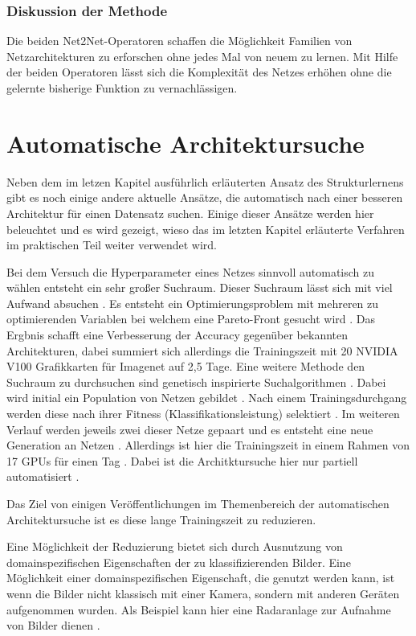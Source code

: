 \subsubsection{Diskussion der Methode}

Die beiden Net2Net-Operatoren schaffen die Möglichkeit Familien von Netzarchitekturen zu erforschen ohne jedes Mal von neuem zu lernen. Mit Hilfe der beiden Operatoren lässt sich die Komplexität des Netzes erhöhen ohne die gelernte bisherige Funktion zu vernachlässigen.




\section{Automatische Architektursuche}\label{sec:auto}
Neben dem im letzen Kapitel ausführlich erläuterten Ansatz des Strukturlernens gibt es noch einige andere aktuelle Ansätze, die automatisch nach einer besseren Architektur für einen Datensatz suchen. Einige dieser Ansätze werden hier beleuchtet und es wird gezeigt, wieso das im letzten Kapitel erläuterte Verfahren im praktischen Teil weiter verwendet wird.

Bei dem Versuch die Hyperparameter eines Netzes sinnvoll automatisch zu wählen entsteht ein sehr großer Suchraum. Dieser Suchraum lässt sich mit viel Aufwand absuchen \cite{dvolver}. Es entsteht ein Optimierungsproblem mit mehreren zu optimierenden Variablen bei welchem eine Pareto-Front gesucht wird \cite{dvolver}. Das Ergbnis schafft eine Verbesserung der Accuracy gegenüber bekannten Architekturen, dabei summiert sich allerdings die Trainingszeit mit 20 NVIDIA V100 Grafikkarten für Imagenet auf 2,5 Tage\cite{dvolver}.
\color{blue1}
Eine weitere Methode den Suchraum zu durchsuchen sind genetisch inspirierte Suchalgorithmen \cite{gen}. Dabei wird initial ein Population von Netzen gebildet \cite{gen}. Nach einem Trainingsdurchgang werden diese nach ihrer Fitness (Klassifikationsleistung) selektiert \cite{gen}. Im weiteren Verlauf werden jeweils zwei dieser Netze gepaart und es entsteht eine neue Generation an Netzen \cite{gen}. Allerdings ist hier die Trainingszeit in einem Rahmen von 17 GPUs für einen Tag \cite{gen}. Dabei ist die Architktursuche hier nur partiell automatisiert \cite{gen}.  

Das Ziel von einigen Veröffentlichungen im Themenbereich der automatischen Architektursuche ist es diese lange Trainingszeit zu reduzieren.

Eine Möglichkeit der Reduzierung bietet sich durch Ausnutzung von domainspezifischen Eigenschaften der zu klassifizierenden Bilder. Eine Möglichkeit einer domainspezifischen Eigenschaft, die genutzt werden kann, ist wenn die Bilder nicht klassisch mit einer Kamera, sondern mit anderen Geräten aufgenommen wurden. Als Beispiel kann hier eine Radaranlage zur Aufnahme von Bilder dienen \cite{polsar}.


